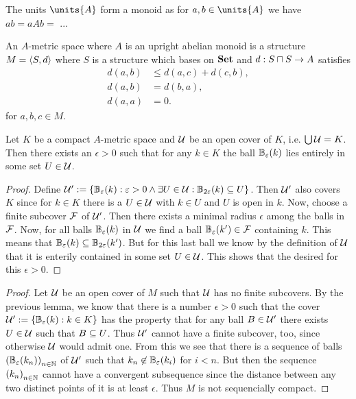 \documentclass[8pt,a4paper]{article}
\begin{document}
\begin{remark}
    The units $\units{A}$ form a monoid as for $a,b\in\units{A}$ we have $ab=aAb=$ ...
\end{remark}

\begin{definition}
    An $A$-metric space where $A$ is an upright abelian monoid is a structure $M=\struct{S,d}$ where $S$ is a structure which bases on $\mathbf{Set}$ and $d:S\setprod S\to A$ satisfies
    \begin{align}
        d(a,b) &\leq d(a,c)+d(c,b),\\
        d(a,b) &=d(b,a),\\
        d(a,a) &=0.
    \end{align}
    for $a,b,c\in M$.
\end{definition}

\begin{lemma}[Lebesgue]
    Let $K$ be a compact $A$-metric space and $\mathcal{U}$ be an open cover of $K$, i.e. $\bigcup\mathcal{U}=K$. Then there exists an $\epsilon>0$ such that for any $k\in K$ the ball $\mathbb{B}_{\varepsilon}(k)$ lies entirely in some set $U\in \mathcal{U}$.
\end{lemma}

\begin{proof}
    Define $\cU':=\set{\ball_{\epsilon}(k):\epsilon>0\lgand\exists U\in\cU:\ball_{2\epsilon}(k)\setleq U}$. Then $\mathcal{U}'$ also covers $K$ since for $k\in K$ there is a $U\in\mathcal{U}$ with $k\in U$ and $U$ is open in $k$. Now, choose a finite subcover $\mathcal{F}$ of $\mathcal{U}'$. Then there exists a minimal radius $\epsilon$ among the balls in $\mathcal{F}$. Now, for all balls $\mathbb{B}_{\varepsilon}(k)$ in $\mathcal{U}$ we find a ball $\mathbb{B}_{\varepsilon}(k')\in\mathcal{F}$ containing $k$. This means that $\mathbb{B}_{\varepsilon}(k)\subseteq\mathbb{B}_{2\varepsilon}(k')$. But for this last ball we know by the definition of $\mathcal{U}$ that it is enterily contained in some set $U\in\mathcal{U}$.
    This shows that the desired for this $\epsilon>0$.
\end{proof}

\begin{lemma}

\end{lemma}

\begin{proof}
    Let $\mathcal{U}$ be an open cover of $M$ such that $\mathcal{U}$ has no finite subcovers. By the previous lemma, we know that there is a number $\epsilon>0$ such that the cover $\cU':=\set{\ball_{\epsilon}(k):k\in K}$ has the property that for any ball $B\in \mathcal{U}'$ there exists $U\in\mathcal{U}$ such that $B\subseteq U$. Thus $\mathcal{U}'$ cannot have a finite subcover, too, since otherwise $\mathcal{U}$ would admit one. From this we see that there is a sequence of balls $\net[n\in\nats]{\ball_{\epsilon}(k_n)}$ of $\mathcal{U}'$ such that $k_n\not\in \mathbb{B}_{\varepsilon}(k_i)$ for $i< n$. But then the sequence $\net[n\in\nats]{k_n}$ cannot have a convergent subsequence since the distance between any two distinct points of it is at least $\epsilon$. Thus $M$ is not sequencially compact.
\end{proof}
\end{document}
